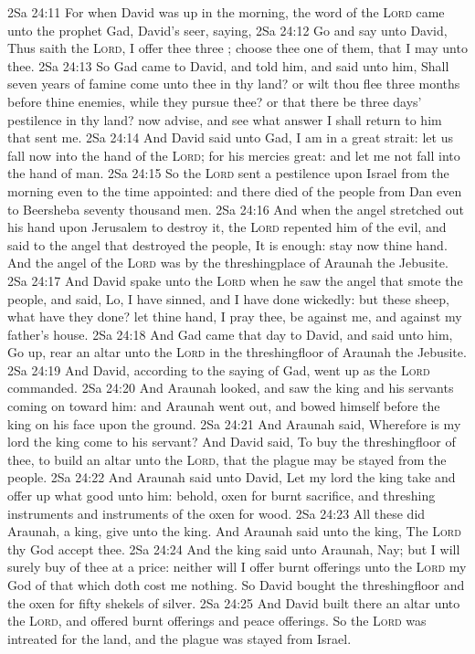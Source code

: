 \vs 2Sa 24:11 For when David was up in the morning, the word of the \textsc{Lord} came unto the prophet Gad, David's seer, saying,
\vs 2Sa 24:12 Go and say unto David, Thus saith the \textsc{Lord}, I offer thee three ; choose thee one of them, that I may  unto thee.
\vs 2Sa 24:13 So Gad came to David, and told him, and said unto him, Shall seven years of famine come unto thee in thy land? or wilt thou flee three months before thine enemies, while they pursue thee? or that there be three days' pestilence in thy land? now advise, and see what answer I shall return to him that sent me.
\vs 2Sa 24:14 And David said unto Gad, I am in a great strait: let us fall now into the hand of the \textsc{Lord}; for his mercies  great: and let me not fall into the hand of man.
\vs 2Sa 24:15 So the \textsc{Lord} sent a pestilence upon Israel from the morning even to the time appointed: and there died of the people from Dan even to Beersheba seventy thousand men.
\vs 2Sa 24:16 And when the angel stretched out his hand upon Jerusalem to destroy it, the \textsc{Lord} repented him of the evil, and said to the angel that destroyed the people, It is enough: stay now thine hand. And the angel of the \textsc{Lord} was by the threshingplace of Araunah the Jebusite.
\vs 2Sa 24:17 And David spake unto the \textsc{Lord} when he saw the angel that smote the people, and said, Lo, I have sinned, and I have done wickedly: but these sheep, what have they done? let thine hand, I pray thee, be against me, and against my father's house.
\vs 2Sa 24:18 And Gad came that day to David, and said unto him, Go up, rear an altar unto the \textsc{Lord} in the threshingfloor of Araunah the Jebusite.
\vs 2Sa 24:19 And David, according to the saying of Gad, went up as the \textsc{Lord} commanded.
\vs 2Sa 24:20 And Araunah looked, and saw the king and his servants coming on toward him: and Araunah went out, and bowed himself before the king on his face upon the ground.
\vs 2Sa 24:21 And Araunah said, Wherefore is my lord the king come to his servant? And David said, To buy the threshingfloor of thee, to build an altar unto the \textsc{Lord}, that the plague may be stayed from the people.
\vs 2Sa 24:22 And Araunah said unto David, Let my lord the king take and offer up what  good unto him: behold,  oxen for burnt sacrifice, and threshing instruments and  instruments of the oxen for wood.
\vs 2Sa 24:23 All these  did Araunah,  a king, give unto the king. And Araunah said unto the king, The \textsc{Lord} thy God accept thee.
\vs 2Sa 24:24 And the king said unto Araunah, Nay; but I will surely buy  of thee at a price: neither will I offer burnt offerings unto the \textsc{Lord} my God of that which doth cost me nothing. So David bought the threshingfloor and the oxen for fifty shekels of silver.
\vs 2Sa 24:25 And David built there an altar unto the \textsc{Lord}, and offered burnt offerings and peace offerings. So the \textsc{Lord} was intreated for the land, and the plague was stayed from Israel.
